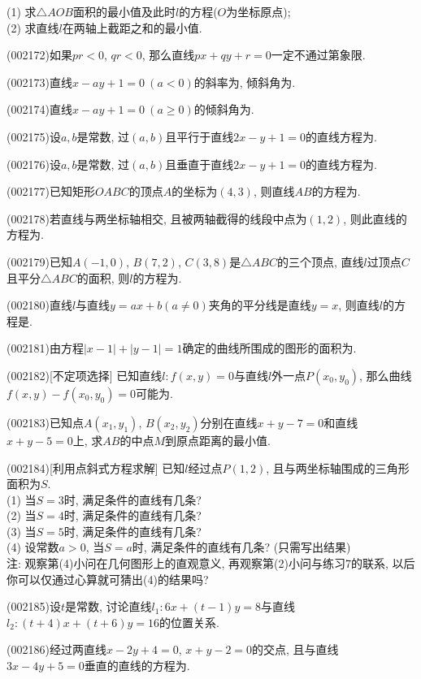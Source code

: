 (1) 求$\triangle AOB$面积的最小值及此时$l$的方程($O$为坐标原点);\\ 
(2) 求直线$l$在两轴上截距之和的最小值.
\item (002172)如果$pr<0$, $qr<0$, 那么直线$px+qy+r=0$一定不通过第象限.
\item (002173)直线$x-ay+1=0\ (a<0)$的斜率为, 倾斜角为.
\item (002174)直线$x-ay+1=0\ (a\geq 0)$的倾斜角为.
\item (002175)设$a,b$是常数, 过$(a,b)$且平行于直线$2x-y+1=0$的直线方程为.
\item (002176)设$a,b$是常数, 过$(a,b)$且垂直于直线$2x-y+1=0$的直线方程为.
\item (002177)已知矩形$OABC$的顶点$A$的坐标为$(4,3)$, 则直线$AB$的方程为.
\item (002178)若直线与两坐标轴相交, 且被两轴截得的线段中点为$(1,2)$, 则此直线的方程为.
\item (002179)已知$A(-1,0)$, $B(7,2)$, $C(3,8)$是$\triangle ABC$的三个顶点,
直线$l$过顶点$C$且平分$\triangle ABC$的面积, 则$l$的方程为.
\item (002180)直线$l$与直线$y=ax+b(a\ne 0)$夹角的平分线是直线$y=x$, 则直线$l$的方程是.
\item (002181)由方程$|x-1|+|y-1|=1$确定的曲线所围成的图形的面积为.
\item (002182)[不定项选择]
已知直线$l:f(x,y)=0$与直线$l$外一点$P(x_0,y_0)$, 那么曲线$f(x,y)-f(x_0,y_0)=0$可能为.
\item (002183)已知点$A(x_1,y_1)$, $B(x_2,y_2)$分别在直线$x+y-7=0$和直线$x+y-5=0$上, 求$AB$的中点$M$到原点距离的最小值.
\item (002184)[利用点斜式方程求解]
已知$l$经过点$P(1,2)$, 且与两坐标轴围成的三角形面积为$S$.\\ 
(1) 当$S=3$时, 满足条件的直线有几条?\\ 
(2) 当$S=4$时, 满足条件的直线有几条?\\ 
(3) 当$S=5$时, 满足条件的直线有几条?\\ 
(4) 设常数$a>0$, 当$S=a$时, 满足条件的直线有几条? (只需写出结果)\\ 
注: 观察第(4)小问在几何图形上的直观意义, 再观察第(2)小问与练习7的联系, 以后你可以仅通过心算就可猜出(4)的结果吗?
\item (002185)设$t$是常数, 讨论直线$l_1:6x+(t-1)y=8$与直线$l_2:(t+4)x+(t+6)y=16$的位置关系.
\item (002186)经过两直线$x-2y+4=0$, $x+y-2=0$的交点, 且与直线$3x-4y+5=0$垂直的直线的方程为.
